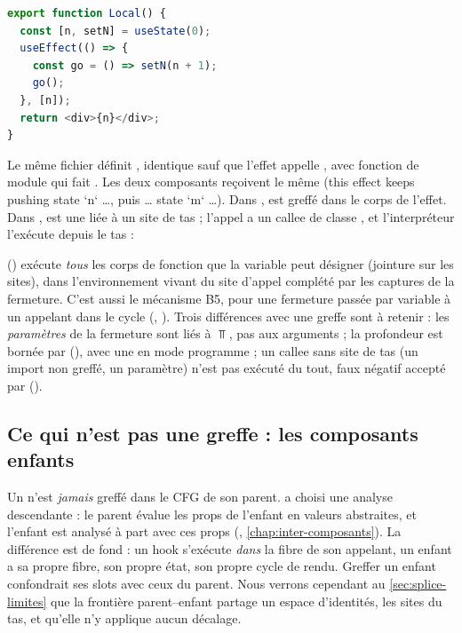 \begin{lstlisting}[language=TypeScript]
export function Local() {
  const [n, setN] = useState(0);
  useEffect(() => {
    const go = () => setN(n + 1);
    go();
  }, [n]);
  return <div>{n}</div>;
}
\end{lstlisting}

Le même fichier définit , identique sauf que l'effet appelle , avec  fonction de module qui fait . Les deux composants reçoivent le même  (\og this effect keeps pushing state `n` …\fg{}, puis \og … state `m` …\fg{}). Dans ,  est greffé dans le corps de l'effet. Dans ,  est une  liée à un site de tas ; l'appel  a un callee de classe , et l'interpréteur l'exécute depuis le tas :


 () exécute \emph{tous} les corps de fonction que la variable peut désigner (jointure sur les sites), dans l'environnement vivant du site d'appel complété par les captures de la fermeture. C'est aussi le mécanisme B5, pour une fermeture passée par variable à un appelant \og dans le cycle\fg{} (, ). Trois différences avec une greffe sont à retenir : les \emph{paramètres} de la fermeture sont liés à $\Top$, pas aux arguments ; la profondeur est bornée par  (), avec une \Info{} en mode programme ; un callee sans site de tas (un import non greffé, un paramètre) n'est pas exécuté du tout, faux négatif accepté par  ().

\subsection{Ce qui n'est pas une greffe : les composants enfants}

Un  n'est \emph{jamais} greffé dans le CFG de son parent.  a choisi une analyse descendante : le parent évalue les props de l'enfant en valeurs abstraites, et l'enfant est analysé à part avec ces props (, \cref{chap:inter-composants}). La différence est de fond : un hook s'exécute \emph{dans} la fibre de son appelant, un enfant a sa propre fibre, son propre état, son propre cycle de rendu. Greffer un enfant confondrait ses slots avec ceux du parent. Nous verrons cependant au \cref{sec:splice-limites} que la frontière parent--enfant partage un espace d'identités, les sites du tas, et qu'elle n'y applique aucun décalage.

